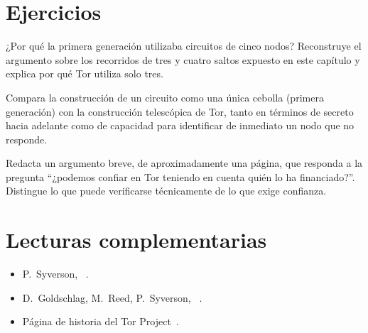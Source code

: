 \section*{Ejercicios}

\begin{esercizio}[1]\label{es:03-cinque}
¿Por qué la primera generación utilizaba circuitos de cinco nodos? Reconstruye el argumento sobre los recorridos de tres y cuatro saltos expuesto en este capítulo y explica por qué Tor utiliza solo tres.
\end{esercizio}

\begin{esercizio}[2]\label{es:03-cipolla}
Compara la construcción de un circuito como una única cebolla (primera generación) con la construcción telescópica de Tor, tanto en términos de secreto hacia adelante como de capacidad para identificar de inmediato un nodo que no responde.
\end{esercizio}

\begin{esercizio}[2]\label{es:03-fiducia}
Redacta un argumento breve, de aproximadamente una página, que responda a la pregunta \enquote{¿podemos confiar en Tor teniendo en cuenta quién lo ha financiado?}. Distingue lo que puede verificarse técnicamente de lo que exige confianza.
\end{esercizio}

\section*{Lecturas complementarias}
\begin{itemize}
  \item P.~Syverson, ~\cite{syverson2011peel}.
  \item D.~Goldschlag, M.~Reed, P.~Syverson, ~\cite{goldschlag1996hiding}.
  \item Página de historia del Tor Project~\cite{torhistory}.
\end{itemize}
